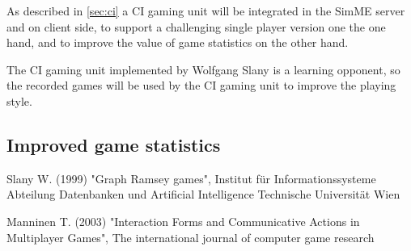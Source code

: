 		As described in \ref{sec:ci} a CI gaming unit will be integrated in the
		SimME server and on client side, to support a challenging single player
		version one the one hand, and to improve the value of game statistics on
		the other hand.
		
		The CI gaming unit implemented by Wolfgang Slany is a learning opponent,
		so the recorded games will be used by the CI gaming unit to improve the
		playing style.
	
	\subsection{Improved game statistics}


\newpage

\begin{thebibliography}{10}

	 Slany W. (1999) "Graph Ramsey games",
	Institut f\"{u}r Informationssysteme Abteilung Datenbanken und Artificial
	Intelligence Technische Universit\"{a}t Wien
	
	 Manninen T. (2003) "Interaction Forms and
	Communicative Actions in Multiplayer Games", The international journal of
	computer game research
	
\end{thebibliography}


